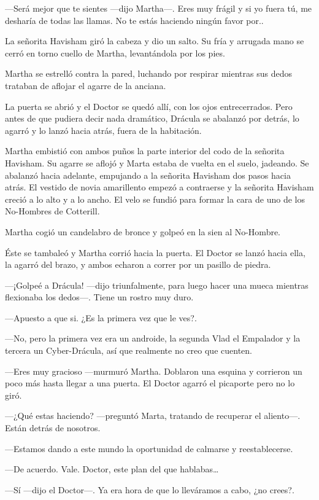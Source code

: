 ---Será mejor que te sientes ---dijo Martha---. Eres muy frágil y si yo fuera tú, me desharía de todas las llamas. No te estás haciendo ningún favor por..

La señorita Havisham giró la cabeza y dio un salto. Su fría y arrugada mano se cerró en torno cuello de Martha, levantándola por los pies.

Martha se estrelló contra la pared, luchando por respirar mientras sus dedos trataban de aflojar el agarre de la anciana.

La puerta se abrió y el Doctor se quedó allí, con los ojos entrecerrados. Pero antes de que pudiera decir nada dramático, Drácula se abalanzó por detrás, lo agarró y lo lanzó hacia atrás, fuera de la habitación.

Martha embistió con ambos puños la parte interior del codo de la señorita Havisham. Su agarre se aflojó y Marta estaba de vuelta en el suelo, jadeando. Se abalanzó hacia adelante, empujando a la señorita Havisham dos pasos hacia atrás. El vestido de novia amarillento empezó a contraerse y la señorita Havisham creció a lo alto y a lo ancho. El velo se fundió para formar la cara de uno de los No-Hombres de Cotterill.

Martha cogió un candelabro de bronce y golpeó en la sien al No-Hombre.

Éste se tambaleó y Martha corrió hacia la puerta. El Doctor se lanzó hacia ella, la agarró del brazo, y ambos echaron a correr por un pasillo de piedra.

---¡Golpeé a Drácula! ---dijo triunfalmente, para luego hacer una mueca mientras flexionaba los dedos---. Tiene un rostro muy duro.

---Apuesto a que si. ¿Es la primera vez que le ves?.

---No, pero la primera vez era un androide, la segunda Vlad el Empalador y la tercera un Cyber-Drácula, así que realmente no creo que cuenten.

---Eres muy gracioso ---murmuró Martha. Doblaron una esquina y corrieron un poco más hasta llegar a una puerta. El Doctor agarró el picaporte pero no lo giró.

---¿Qué estas haciendo? ---preguntó Marta, tratando de recuperar el aliento---. Están detrás de nosotros.

---Estamos dando a este mundo la oportunidad de calmarse y reestablecerse.

---De acuerdo. Vale. Doctor, este plan del que hablabas\ldots{}

---Sí ---dijo el Doctor---. Ya era hora de que lo lleváramos a cabo, ¿no crees?.

